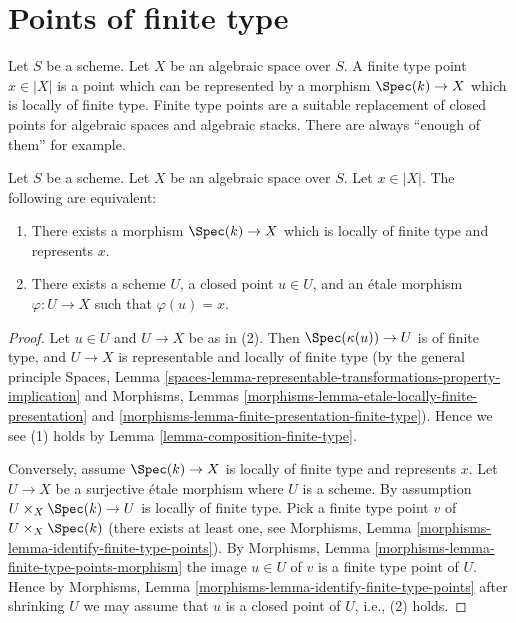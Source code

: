 \section{Points of finite type}
\label{section-points-finite-type}

\noindent
Let $S$ be a scheme. Let $X$ be an algebraic space over $S$.
A finite type point $x \in |X|$ is a point which can be represented by
a morphism $\Spec(k) \to X$ which is locally of finite type.
Finite type points are a suitable replacement of closed points for algebraic
spaces and algebraic stacks. There are always ``enough of them'' for example.

\begin{lemma}
\label{lemma-point-finite-type}
Let $S$ be a scheme. Let $X$ be an algebraic space over $S$.
Let $x \in |X|$. The following are equivalent:
\begin{enumerate}
\item There exists a morphism $\Spec(k) \to X$
which is locally of finite type and represents $x$.
\item There exists a scheme $U$, a closed point $u \in U$, and an \'etale
morphism $\varphi : U \to X$ such that $\varphi(u) = x$.
\end{enumerate}
\end{lemma}

\begin{proof}
Let $u \in U$ and $U \to X$ be as in (2). Then
$\Spec(\kappa(u)) \to U$ is of finite type, and $U \to X$ is
representable and locally of finite type (by the general principle
Spaces, Lemma
\ref{spaces-lemma-representable-transformations-property-implication}
and
Morphisms, Lemmas \ref{morphisms-lemma-etale-locally-finite-presentation} and
\ref{morphisms-lemma-finite-presentation-finite-type}). Hence we see
(1) holds by
Lemma \ref{lemma-composition-finite-type}.

\medskip\noindent
Conversely, assume $\Spec(k) \to X$ is locally of finite type and
represents $x$. Let $U \to X$ be a surjective \'etale morphism where $U$
is a scheme. By assumption $U \times_X \Spec(k) \to U$ is locally
of finite type. Pick a finite type point $v$ of
$U \times_X \Spec(k)$ (there exists at least one, see
Morphisms, Lemma \ref{morphisms-lemma-identify-finite-type-points}).
By
Morphisms, Lemma \ref{morphisms-lemma-finite-type-points-morphism}
the image $u \in U$ of $v$ is a finite type point of $U$.
Hence by
Morphisms, Lemma \ref{morphisms-lemma-identify-finite-type-points}
after shrinking $U$ we may assume that $u$ is a closed point of $U$, i.e.,
(2) holds.
\end{proof}

